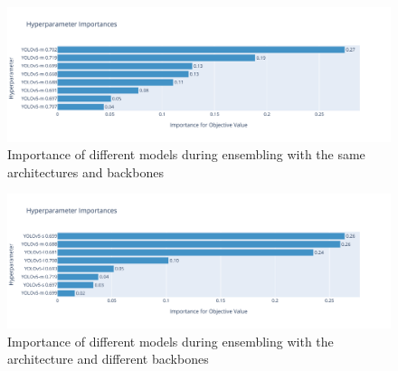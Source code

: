 \begin{figure}
    \centering
    \includegraphics[width=\linewidth]{images/ensemble_yolo_importance.pdf}
    \caption{Importance of different models during ensembling with the same architectures and backbones}
\end{figure}

\begin{figure}
    \centering
    \includegraphics[width=\linewidth]{images/ensemble_yolo_mix_importance.pdf}
    \caption{Importance of different models during ensembling with the architecture and different backbones}
\end{figure}

